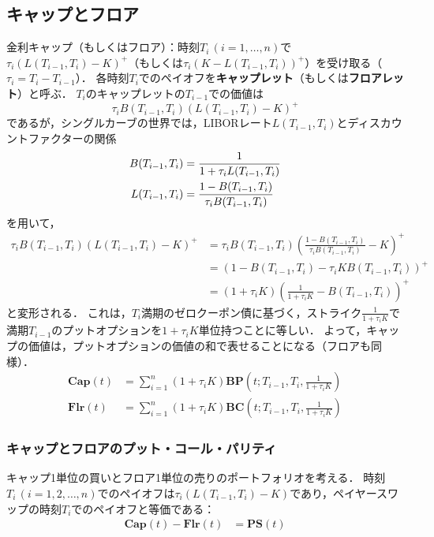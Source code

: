 \documentclass[a4paper, lualatex, ja=standard]{bxjsarticle}
\theoremstyle{theorem}
\theoremstyle{definition}
\newcommand{\BC}{\mathbf{BC}}
\newcommand{\BP}{\mathbf{BP}}
\begin{document}
\subsection{キャップとフロア}
金利キャップ（もしくはフロア）：時刻$T_i\,(i=1,\ldots,n)$で$\tau_i(L(T_{i-1},T_i)-K)^{+}$（もしくは$\tau_i(K-L(T_{i-1},T_i))^{+}$）を受け取る（$\tau_i=T_i-T_{i-1}$）．
各時刻$T_i$でのペイオフを\textbf{キャップレット}（もしくは\textbf{フロアレット}）と呼ぶ．
$T_i$のキャップレットの$T_{i-1}$での価値は
\begin{equation*}
  \tau_iB(T_{i-1},T_i)(L(T_{i-1},T_i)-K)^{+}
\end{equation*}
であるが，シングルカーブの世界では，LIBORレート$L(T_{i-1},T_i)$とディスカウントファクターの関係
\begin{align}
  B(T_{i-1},T_i) &= \frac{1}{1+\tau_iL(T_{i-1},T_i)} \notag\\
  L(T_{i-1},T_i) &= \frac{1-B(T_{i-1},T_i)}{\tau_iB(T_{i-1},T_i)} \notag
\end{align}
を用いて，
\begin{align*}
  \tau_iB(T_{i-1},T_i)(L(T_{i-1},T_i)-K)^{+} &= \tau_iB(T_{i-1},T_i)\left(\frac{1-B(T_{i-1},T_i)}{\tau_iB(T_{i-1},T_i)}-K\right)^{+} \\
  &= \left(1-B(T_{i-1},T_i)-\tau_iKB(T_{i-1},T_i)\right)^{+}\\
  &= (1+\tau_iK)\left(\frac{1}{1+\tau_iK}-B(T_{i-1},T_i)\right)^{+}
\end{align*}
と変形される．
これは，$T_i$満期のゼロクーポン債に基づく，ストライク$\frac{1}{1+\tau_iK}$で満期$T_{i-1}$のプットオプションを$1+\tau_iK$単位持つことに等しい．
よって，キャップの価値は，プットオプションの価値の和で表せることになる（フロアも同様）．
\begin{align*}
  \mathbf{Cap}(t) &= \sum_{i=1}^n (1+\tau_iK)\BP\left(t;T_{i-1},T_i,\frac{1}{1+\tau_iK}\right) \\
  \mathbf{Flr}(t) &= \sum_{i=1}^n (1+\tau_iK)\BC\left(t;T_{i-1},T_i,\frac{1}{1+\tau_iK}\right)
\end{align*}

\subsubsection*{キャップとフロアのプット・コール・パリティ}
キャップ1単位の買いとフロア1単位の売りのポートフォリオを考える．
時刻$T_i\,(i=1,2,\ldots,n)$でのペイオフは$\tau_i(L(T_{i-1},T_i)-K)$であり，ペイヤースワップの時刻$T_i$でのペイオフと等価である：
\begin{align*}
  \mathbf{Cap}(t) - \mathbf{Flr}(t) &= \mathbf{PS}(t) 
\end{align*}
\end{document}

